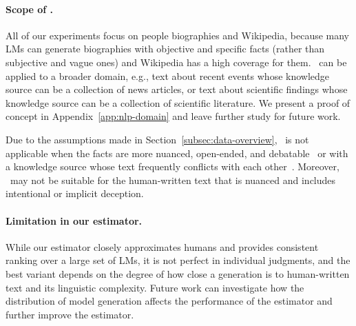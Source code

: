 \paragraph{Scope of \ours.}
All of our experiments focus on people biographies and Wikipedia, because many LMs can generate biographies with objective and specific facts (rather than subjective and vague ones) and Wikipedia has a high coverage for them.
\ours\ can be applied to a broader domain, e.g., text about recent events whose knowledge source can be a collection of news articles, or text about scientific findings whose knowledge source can be a collection of scientific literature.
We present a proof of concept in Appendix~\ref{app:nlp-domain} and leave further study for future work.

Due to the assumptions made in Section~\ref{subsec:data-overview},
\ours\ is not applicable when the facts are more nuanced, open-ended, and debatable~\citep{chen2019seeing,xu2023critical} or with a knowledge source whose text frequently conflicts with each other~\citep{wadden2022scifact}.
Moreover, \ours\ may not be suitable for the human-written text that is nuanced and includes intentional or implicit deception.


\vspace{-.1em}
\paragraph{Limitation in our estimator.}
While our estimator closely approximates humans and provides consistent ranking over a large set of LMs, it is not perfect in individual judgments, and the best variant depends on the degree of how close a generation is to human-written text and its linguistic complexity.
Future work can investigate how the distribution of model generation affects the performance of the estimator and further improve the estimator.

\vspace{-.1em}
